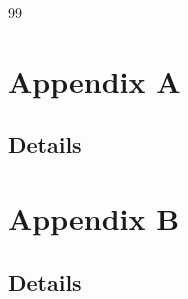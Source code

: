 \documentclass[11pt]{report}
\begin{document}

\begin{thebibliography}{99}
  \printbibliography
\end{thebibliography}


\chapter*{Appendix A}
\section*{Details}

\chapter*{Appendix B}
\section*{Details}
\end{document}
